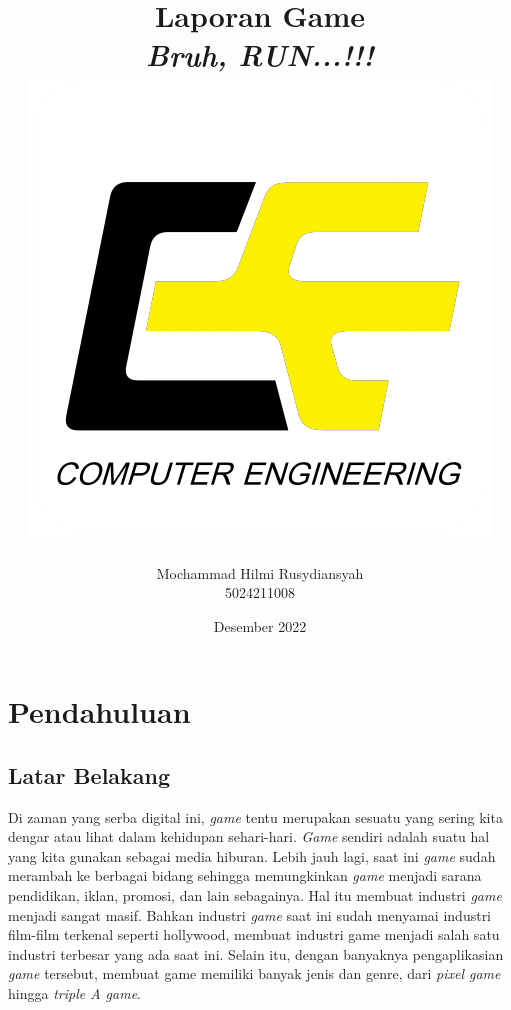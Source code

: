 \documentclass[oneside, a4paper ,12pt]{book}
\begin{document}
	
	\author{Mochammad Hilmi Rusydiansyah \\ 5024211008}
	\title{Laporan Game \\ \emph{Bruh, RUN...!!!} \\ \includegraphics[width=8 cm]{ce.png}}
	\date{Desember 2022}
	
	\frontmatter
	\maketitle
	\tableofcontents
	
	\mainmatter
	\chapter{Pendahuluan}
	\section{Latar Belakang}
	
	Di zaman yang serba digital ini, \textit{game} tentu merupakan sesuatu yang sering kita dengar atau lihat dalam kehidupan sehari-hari. \textit{Game} sendiri adalah suatu hal yang kita gunakan sebagai media hiburan. Lebih jauh lagi, saat ini \textit{game} sudah merambah ke berbagai bidang sehingga memungkinkan \textit{game} menjadi sarana pendidikan, iklan, promosi, dan lain sebagainya. Hal itu membuat industri \textit{game} menjadi sangat masif. Bahkan industri \textit{game} saat ini sudah menyamai industri film-film terkenal seperti hollywood, membuat industri game menjadi salah satu industri terbesar yang ada saat ini. Selain itu, dengan banyaknya pengaplikasian \textit{game} tersebut, membuat game memiliki banyak jenis dan genre, dari \textit{pixel game} hingga \textit{triple A game}.
	
\end{document}
